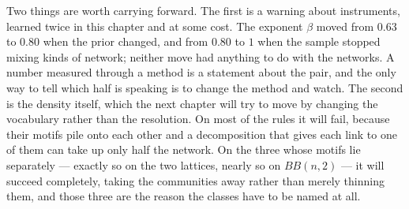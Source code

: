 Two things are worth carrying forward. The first is a warning about instruments,
learned twice in this chapter and at some cost. The exponent $\beta$ moved from
$0.63$ to $0.80$ when the prior changed, and from $0.80$ to $1$ when the sample
stopped mixing kinds of network; neither move had anything to do with the
networks. A number measured through a method is a statement about the pair, and
the only way to tell which half is speaking is to change the method and watch.
The second is the density itself, which the next chapter will try to move by
changing the vocabulary rather than the resolution. On most of the rules it will
fail, because their motifs pile onto each other and a decomposition that gives
each link to one of them can take up only half the network. On the three whose
motifs lie separately --- exactly so on the two lattices, nearly so on
$BB(n,2)$ --- it will succeed completely, taking the communities away rather than
merely thinning them, and those three are the reason the classes have to be named
at all.
